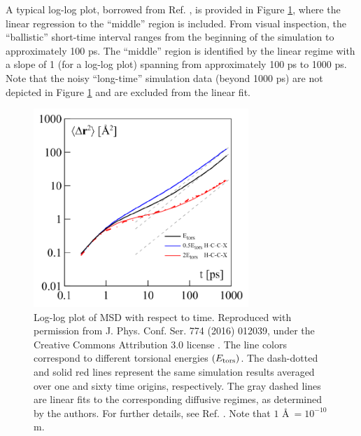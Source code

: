 \documentclass[9pt,bestpractices]{livecoms}
\begin{document}
A typical log-log plot, borrowed from Ref. \cite{Kondratyuk2016}, is provided in Figure \ref{fig:KondratyukFig2}, where the linear regression to the ``middle'' region is included. From visual inspection, the ``ballistic'' short-time interval ranges from the beginning of the simulation to approximately 100 ps. The ``middle'' region is identified by the linear regime with a slope of 1 (for a log-log plot) spanning from approximately 100 ps to 1000 ps. Note that the noisy ``long-time'' simulation data (beyond 1000 ps) are not depicted in Figure \ref{fig:KondratyukFig2} and are excluded from the linear fit.


\begin{figure}[htb!]
	\centering
	\includegraphics[width=3.2in]{KondratyukFig2.png}
	\caption{Log-log plot of MSD with respect to time. Reproduced with permission from J. Phys. Conf. Ser. 774 (2016) 012039, under the Creative Commons Attribution 3.0 license \cite{Kondratyuk2016}. The line colors correspond to different torsional energies $(E_{\rm tors})$. The dash-dotted and solid red lines represent the same simulation results averaged over one and sixty time origins, respectively. The gray dashed lines are linear fits to the corresponding diffusive regimes, as determined by the authors. For further details, see Ref. \cite{Kondratyuk2016}. Note that $1$ \AA $\ = 10^{-10}$ m.}%
	\label{fig:KondratyukFig2}
\end{figure}
\end{document}
